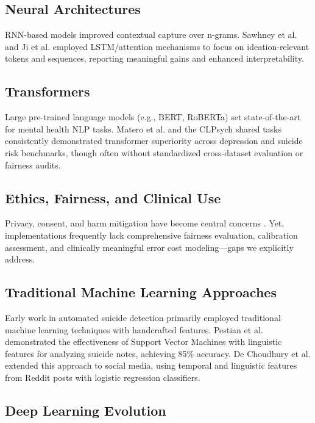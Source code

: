 \documentclass[conference]{IEEEtran}
\begin{document}
\subsection{Neural Architectures}
RNN-based models improved contextual capture over n-grams. Sawhney et al. \cite{sawhney2018} and Ji et al. \cite{ji2020} employed LSTM/attention mechanisms to focus on ideation-relevant tokens and sequences, reporting meaningful gains and enhanced interpretability.

\subsection{Transformers}
Large pre-trained language models (e.g., BERT, RoBERTa) set state-of-the-art for mental health NLP tasks. Matero et al. \cite{matero2021} and the CLPsych shared tasks \cite{zirikly2019} consistently demonstrated transformer superiority across depression and suicide risk benchmarks, though often without standardized cross-dataset evaluation or fairness audits.

\subsection{Ethics, Fairness, and Clinical Use}
Privacy, consent, and harm mitigation have become central concerns \cite{benton2017, chancellor2020}. Yet, implementations frequently lack comprehensive fairness evaluation, calibration assessment, and clinically meaningful error cost modeling—gaps we explicitly address.

\subsection{Traditional Machine Learning Approaches}

Early work in automated suicide detection primarily employed traditional machine learning techniques with handcrafted features. Pestian et al. \cite{pestian2016} demonstrated the effectiveness of Support Vector Machines with linguistic features for analyzing suicide notes, achieving 85\% accuracy. De Choudhury et al. \cite{dechoudhury2016} extended this approach to social media, using temporal and linguistic features from Reddit posts with logistic regression classifiers.

\subsection{Deep Learning Evolution}
\end{document}
